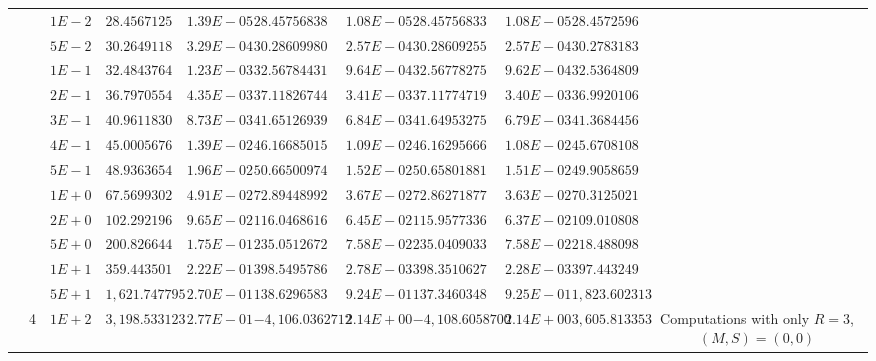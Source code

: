 \begin{landscape}
\begin{table}[ht]
{\begin{tabular}[c]{c|c|c|c|c|c|c|c|c|c|c}
& &$1E-2$ & $28.456712525178$ & $1.39E-05$ & $28.457568384542$ & $1.08E-05$ & $28.457568330153$ & $1.08E-05$ & $28.457259680513$ & \\
& &$5E-2$ & $30.264911808725$ & $3.29E-04$ & $30.286099804477$ & $2.57E-04$ & $30.286092551993$ & $2.57E-04$ & $30.278318327442$ & \\
& &$1E-1$ & $32.484376480755$ & $1.23E-03$ & $32.567844313365$ & $9.64E-04$ & $32.567782756221$ & $9.62E-04$ & $32.536480931004$ & \\
& &$2E-1$ & $36.797055408932$ & $4.35E-03$ & $37.118267444379$ & $3.41E-03$ & $37.117747195788$ & $3.40E-03$ & $36.992010607447$ & \\
& &$3E-1$ & $40.961183077452$ & $8.73E-03$ & $41.651269393041$ & $6.84E-03$ & $41.649532751687$ & $6.79E-03$ & $41.368445666447$ & \\
& &$4E-1$ & $45.000567680461$ & $1.39E-02$ & $46.166850159352$ & $1.09E-02$ & $46.162956661990$ & $1.08E-02$ & $45.670810879121$ & \\
& &$5E-1$ & $48.936365417564$ & $1.96E-02$ & $50.665009743311$ & $1.52E-02$ & $50.658018810789$ & $1.51E-02$ & $49.905865978617$ & \\
& &$1E+0$ & $67.569930222732$ & $4.91E-02$ & $72.894489927834$ & $3.67E-02$ & $72.862718779832$ & $3.63E-02$ & $70.312502175757$ & \\
& &$2E+0$ & $102.292196585864$ & $9.65E-02$ & $116.046861620514$ & $6.45E-02$ & $115.957733687333$ & $6.37E-02$ & $109.010808418516$ & \\
& &$5E+0$ & $200.826644244514$ & $1.75E-01$ & $235.051267287627$ & $7.58E-02$ & $235.040903379153$ & $7.58E-02$ & $218.488098056035$ & \\
& &$1E+1$ & $359.443501215690$ & $2.22E-01$ & $398.549578696396$ & $2.78E-03$ & $398.351062771176$ & $2.28E-03$ & $397.443249829703$ & \\
& &$5E+1$ & $1,621.747795925120$ & $2.70E-01$ & $138.629658327638$ & $9.24E-01$ & $137.346034838477$ & $9.25E-01$ & $1,823.602313382110$ & \\
& \multirow{-23}{*}{4} &$1E+2$ & $3,198.533123735590$ & $2.77E-01$ & $-4,106.036271230580$ & $2.14E+00$ & $-4,108.605870024660$ & $2.14E+00$ & $3,605.813353473020$ & \multirow{-23}{3cm}{Computations with only $R=3$, $(M,S)=(0,0)$}  \\  \cline{2-11}


\end{tabular}}
\end{table}
\end{landscape}
